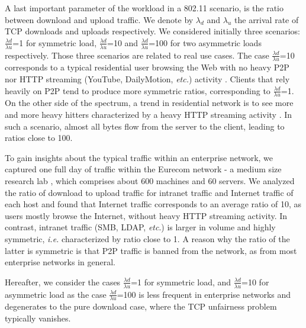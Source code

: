 \documentclass[preprint,12pt]{elsarticle}
\begin{document}
A last important parameter of the workload in a 802.11 scenario, is the ratio between download and upload traffic. We denote by $\lambda_{d}$ and $\lambda_{u}$ the arrival rate of TCP downloads and uploads respectively. We considered initially  three scenarios: $\frac{\lambda{d}}{\lambda{u}}$=1 for symmetric load, $\frac{\lambda{d}}{\lambda{u}}$=10 and $\frac{\lambda{d}}{\lambda{u}}$=100 for two asymmetric loads respectively. Those three scenarios are related to real use cases. The case $\frac{\lambda{d}}{\lambda{u}}$=10  corresponds to a typical residential user browsing the Web with no  heavy P2P nor HTTP streaming (YouTube, DailyMotion, \textit{etc.}) activity \cite{Pietrzyk2011}. Clients that rely heavily on P2P tend to produce more symmetric ratios, corresponding to $\frac{\lambda{d}}{\lambda{u}}$=1. On the other side of the spectrum, a trend in residential network is to see more and more heavy hitters characterized by a heavy HTTP streaming activity \cite{Pietrzyk2011}. In such a scenario, almost all bytes flow from the server to the client, leading to ratios close to 100.


To gain insights about the typical traffic within an enterprise network, we captured one full day of traffic within the Eurecom network - a medium size research lab%
, which comprises about 600 machines and 60 servers. We analyzed the ratio of download to upload traffic for intranet traffic and Internet traffic of each host and found that Internet traffic corresponds to an average ratio of 10, as users mostly browse the Internet, without heavy HTTP streaming activity. In contrast, intranet traffic (SMB, LDAP, \textit{etc}.) is  larger in volume and highly symmetric, \textit{i.e.} characterized by ratio close to 1. A reason why the ratio of the latter is symmetric is that P2P traffic is banned from the network, as from most enterprise networks in general. 


Hereafter, we consider the cases  $\frac{\lambda{d}}{\lambda{u}}$=1 for symmetric load, and $\frac{\lambda{d}}{\lambda{u}}$=10 for asymmetric load as the case $\frac{\lambda{d}}{\lambda{u}}$=100 is less frequent in enterprise networks and degenerates to the pure download case, where the TCP unfairness problem typically vanishes. %
\end{document}

